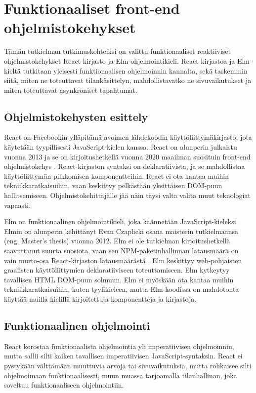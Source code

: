 \chapter{Funktionaaliset front-end ohjelmistokehykset}
Tämän tutkielman tutkimuskohteiksi on valittu funktionaaliset reaktiiviset ohjelmistokehykset React-kirjasto ja
Elm-ohjelmointikieli. React-kirjastoa ja Elm-kieltä tutkitaan yleisesti funktionaalisen ohjelmoinnin kannalta, sekä
tarkemmin siitä, miten ne toteuttavat tilankäsittelyn, mahdollistavatko ne sivuvaikutukset ja miten toteuttavat
asynkroniset tapahtumat.

\section{Ohjelmistokehysten esittely}
React on Facebookin ylläpitämä avoimen lähdekoodin käyttöliittymäkirjasto, jota käytetään tyypillisesti
JavaScript-kielen kanssa. React on alunperin julkaistu vuonna 2013 ja se on kirjoitushetkellä vuonna 2020 maailman
suosituin front-end ohjelmistokehys \cite{npmtrends}. React-kirjaston syntaksi on deklaratiivista, ja se mahdollistaa
käyttöliittymän pilkkomisen komponentteihin. React ei ota kantaa muihin tekniikkaratkaisuihin, vaan keskittyy pelkästään
yksittäisen DOM-puun hallitsemiseen. Ohjelmistokehittäjälle jää näin täysi valta valita muut teknologiat vapaasti.
\cite{reactjs}

Elm on funktionaalinen ohjelmointikieli, joka käännetään JavaScript-kieleksi. Elmin on alunperin kehittänyt Evan
Czaplicki osana maisterin tutkielmaansa (eng. Master's thesis) vuonna 2012. Elm ei ole tutkielman kirjoitushetkellä
saavuttanut suurta suosiota, vaan sen NPM-paketinhallinnan latausmäärä on vain murto-osa React-kirjaston latausmäärästä 
\cite{npmtrends}. Elm keskittyy web-pohjaisten graafisten käyttöliittymien deklaratiiviseen toteuttamiseen. Elm
kytkeytyy tavallisen HTML DOM-puun solmuun. Elm ei myöskään ota kantaa muihin tekniikkaratkaisuihin, kuten tyylikieleen,
mutta Elm-koodissa on mahdotonta käyttää muilla kielillä kirjoitettuja komponentteja ja kirjastoja. \cite{elmlang}

\section{Funktionaalinen ohjelmointi}
React korostaa funktionaalista ohjelmointia yli imperatiivisen ohjelmoinnin, mutta sallii silti kaiken tavallisen
imperatiivisen JavaScript-syntaksin. React ei pystykään välttämään muuttuvia arvoja tai sivuvaikutuksia, mutta rohkaisee
silti ohjelmoimaan funktionaalisesti, muun muassa tarjoamalla tilanhallinan, joka soveltuu funktionaaliseen
ohjelmointiin. \cite{reactjs}

